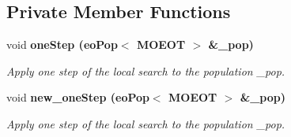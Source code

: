 \subsection*{Private Member Functions}
\begin{CompactItemize}
\item 
void \bf{one\-Step} (\bf{eo\-Pop}$<$ MOEOT $>$ \&\_\-pop)
\begin{CompactList}\small\item\em Apply one step of the local search to the population \_\-pop. \item\end{CompactList}\item 
void \bf{new\_\-one\-Step} (\bf{eo\-Pop}$<$ MOEOT $>$ \&\_\-pop)
\begin{CompactList}\small\item\em Apply one step of the local search to the population \_\-pop. \item\end{CompactList}\end{CompactItemize}
